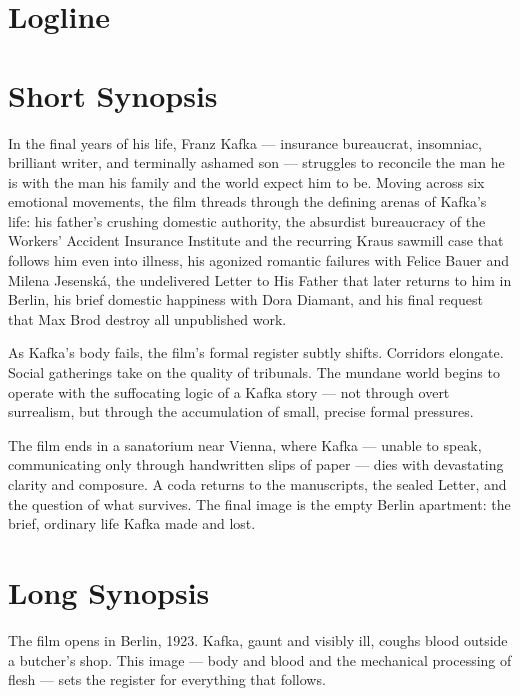 
\section{Logline}

\filmlogline

\section{Short Synopsis}

In the final years of his life, Franz Kafka --- insurance bureaucrat, insomniac, brilliant writer, and terminally ashamed son --- struggles to reconcile the man he is with the man his family and the world expect him to be. Moving across six emotional movements, the film threads through the defining arenas of Kafka's life: his father's crushing domestic authority, the absurdist bureaucracy of the Workers' Accident Insurance Institute and the recurring Kraus sawmill case that follows him even into illness, his agonized romantic failures with Felice Bauer and Milena Jesenská, the undelivered Letter to His Father that later returns to him in Berlin, his brief domestic happiness with Dora Diamant, and his final request that Max Brod destroy all unpublished work.

As Kafka's body fails, the film's formal register subtly shifts. Corridors elongate. Social gatherings take on the quality of tribunals. The mundane world begins to operate with the suffocating logic of a Kafka story --- not through overt surrealism, but through the accumulation of small, precise formal pressures.

The film ends in a sanatorium near Vienna, where Kafka --- unable to speak, communicating only through handwritten slips of paper --- dies with devastating clarity and composure. A coda returns to the manuscripts, the sealed Letter, and the question of what survives. The final image is the empty Berlin apartment: the brief, ordinary life Kafka made and lost.

\section{Long Synopsis}

The film opens in Berlin, 1923. Kafka, gaunt and visibly ill, coughs blood outside a butcher's shop. This image --- body and blood and the mechanical processing of flesh --- sets the register for everything that follows.

